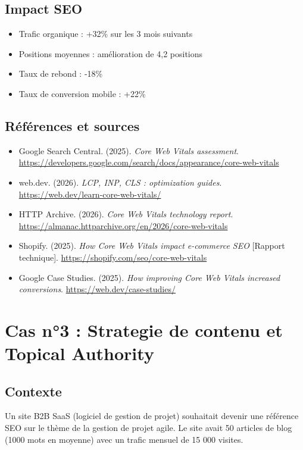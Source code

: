 \documentclass[12pt,a4paper,twoside]{report}
\begin{document}
\subsection{Impact SEO}
\begin{itemize}
    \item Trafic organique : +32\% sur les 3 mois suivants
    \item Positions moyennes : amélioration de 4,2 positions
    \item Taux de rebond : -18\%
    \item Taux de conversion mobile : +22\%
\end{itemize}

\subsection{Références et sources}

\begin{itemize}
    \item Google Search Central. (2025). \textit{Core Web Vitals assessment}. \url{https://developers.google.com/search/docs/appearance/core-web-vitals}
    \item web.dev. (2026). \textit{LCP, INP, CLS : optimization guides}. \url{https://web.dev/learn-core-web-vitals/}
    \item HTTP Archive. (2026). \textit{Core Web Vitals technology report}. \url{https://almanac.httparchive.org/en/2026/core-web-vitals}
    \item Shopify. (2025). \textit{How Core Web Vitals impact e-commerce SEO} [Rapport technique]. \url{https://shopify.com/seo/core-web-vitals}
    \item Google Case Studies. (2025). \textit{How improving Core Web Vitals increased conversions}. \url{https://web.dev/case-studies/}
\end{itemize}

\section{Cas n°3 : Strategie de contenu et Topical Authority}

\subsection{Contexte}
Un site B2B SaaS (logiciel de gestion de projet) souhaitait devenir une référence SEO sur le thème de la gestion de projet agile. Le site avait 50 articles de blog (1000 mots en moyenne) avec un trafic mensuel de 15 000 visites.
\end{document}
